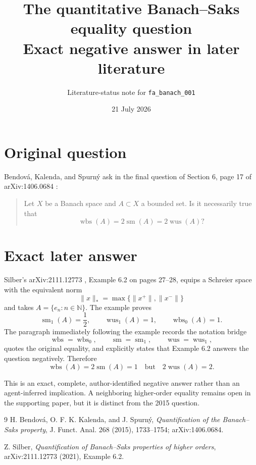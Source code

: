 \documentclass[11pt]{article}
\title{The quantitative Banach--Saks equality question\\
\large Exact negative answer in later literature}
\author{Literature-status note for \texttt{fa\_banach\_001}}
\date{21 July 2026}
\begin{document}
\maketitle

\begin{center}
\end{center}

\section*{Original question}

Bendov\'a, Kalenda, and Spurn\'y ask in the final question of Section 6,
page 17 of arXiv:1406.0684 \cite{BKS}:
\begin{quote}
Let $X$ be a Banach space and $A\subset X$ a bounded set. Is it necessarily
true that
\[
 \operatorname{wbs}(A)=2\operatorname{sm}(A)=2\operatorname{wus}(A)?
\]
\end{quote}

\section*{Exact later answer}

Silber's arXiv:2111.12773 \cite{Silber}, Example 6.2 on pages 27--28,
equips a Schreier space with the equivalent norm
\[
 \|x\|_* = \max\{\|x^+\|,\|x^-\|\}
\]
and takes $A=\{e_n:n\in\mathbb N\}$.  The example proves
\[
 \operatorname{sm}_1(A)=\frac12,\qquad
 \operatorname{wus}_1(A)=1,\qquad
 \operatorname{wbs}_0(A)=1.
\]
The paragraph immediately following the example records the notation bridge
\[
 \operatorname{wbs}=\operatorname{wbs}_0,
 \qquad \operatorname{sm}=\operatorname{sm}_1,
 \qquad \operatorname{wus}=\operatorname{wus}_1,
\]
quotes the original equality, and explicitly states that Example 6.2 answers
the question negatively.  Therefore
\[
 \operatorname{wbs}(A)=2\operatorname{sm}(A)=1
 \quad\text{but}\quad
 2\operatorname{wus}(A)=2.
\]

This is an exact, complete, author-identified negative answer rather than an
agent-inferred implication.  A neighboring higher-order equality remains open
in the supporting paper, but it is distinct from the 2015 question.

\begin{thebibliography}{9}
H. Bendov\'a, O. F. K. Kalenda, and J. Spurn\'y,
\emph{Quantification of the Banach--Saks property},
J. Funct. Anal. 268 (2015), 1733--1754; arXiv:1406.0684.

Z. Silber,
\emph{Quantification of Banach--Saks properties of higher orders},
arXiv:2111.12773 (2021), Example 6.2.
\end{thebibliography}
\end{document}

